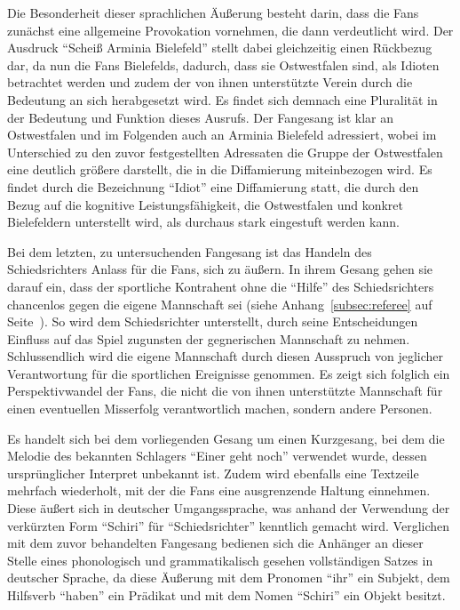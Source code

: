Die Besonderheit dieser sprachlichen Äußerung besteht darin, dass die Fans zunächst eine allgemeine Provokation vornehmen, die dann verdeutlicht wird.
Der Ausdruck "`Scheiß Arminia Bielefeld"' stellt dabei gleichzeitig einen Rückbezug dar, da nun die Fans Bielefelds, dadurch, dass sie Ostwestfalen sind, als Idioten betrachtet werden und zudem der von ihnen unterstützte Verein durch die Bedeutung an sich herabgesetzt wird.
Es findet sich demnach eine Pluralität in der Bedeutung und Funktion dieses Ausrufs.
Der Fangesang ist klar an Ostwestfalen und im Folgenden auch an Arminia Bielefeld adressiert, wobei im Unterschied zu den zuvor festgestellten Adressaten die Gruppe der Ostwestfalen eine deutlich größere darstellt, die in die Diffamierung miteinbezogen wird.
Es findet durch die Bezeichnung "`Idiot"' eine Diffamierung statt, die durch den Bezug auf die kognitive Leistungsfähigkeit, die Ostwestfalen und konkret Bielefeldern unterstellt wird, als durchaus stark eingestuft werden kann.

Bei dem letzten, zu untersuchenden Fangesang ist das Handeln des Schiedsrichters Anlass für die Fans, sich zu äußern.
In ihrem Gesang gehen sie darauf ein, dass der sportliche Kontrahent ohne die "`Hilfe"' des Schiedsrichters chancenlos gegen die eigene Mannschaft sei (siehe Anhang~\ref{subsec:referee} auf Seite~\pageref{subsec:referee}).
So wird dem Schiedsrichter unterstellt, durch seine Entscheidungen Einfluss auf das Spiel zugunsten der gegnerischen Mannschaft zu nehmen.
Schlussendlich wird die eigene Mannschaft durch diesen Ausspruch von jeglicher Verantwortung für die sportlichen Ereignisse genommen.
Es zeigt sich folglich ein Perspektivwandel der Fans, die nicht die von ihnen unterstützte Mannschaft für einen eventuellen Misserfolg verantwortlich machen, sondern andere Personen.

Es handelt sich bei dem vorliegenden Gesang um einen Kurzgesang, bei dem die Melodie des bekannten Schlagers "`Einer geht noch"' verwendet wurde, dessen ursprünglicher Interpret unbekannt ist.
Zudem wird ebenfalls eine Textzeile mehrfach wiederholt, mit der die Fans eine ausgrenzende Haltung einnehmen.
Diese äußert sich in deutscher Umgangssprache, was anhand der Verwendung der verkürzten Form "`Schiri"' für "`Schiedsrichter"' kenntlich gemacht wird.
Verglichen mit dem zuvor behandelten Fangesang bedienen sich die Anhänger an dieser Stelle eines phonologisch und grammatikalisch gesehen vollständigen Satzes in deutscher Sprache, da diese Äußerung mit dem Pronomen "`ihr"' ein Subjekt, dem Hilfsverb "`haben"' ein Prädikat und mit dem Nomen "`Schiri"' ein Objekt besitzt.

